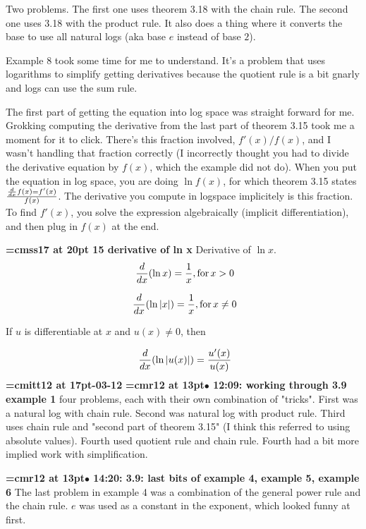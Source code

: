 Two problems. The first one uses theorem 3.18 with the chain rule. The second one uses 3.18 with the product rule. It also does a thing where it converts the base to use all natural logs (aka base $e$ instead of base $2$).
\par

Example 8 took some time for me to understand. It's a problem that uses logarithms to simplify getting derivatives because the quotient rule is a bit gnarly and logs can use the sum rule.
\par

The first part of getting the equation into log space was straight forward for me. Grokking computing the derivative  from the last part of theorem 3.15 took me a moment for it to click. There's this fraction involved, $f'(x)/f(x)$, and I wasn't handling that fraction correctly (I incorrectly thought you had to divide the derivative equation by $f(x)$, which the example did not do). When you put the equation in log space, you are doing $\ln f(x)$, for which theorem 3.15 states ${d \over dx} f(x) = f'(x) \over f(x)$. The derivative you compute in logspace implicitely is this fraction. To find $f'(x)$, you solve the expression algebraically (implicit differentiation), and then plug in $f(x)$ at the end.
\par

{\medskip\noindent\bf\font\titlefont=cmss17 at 20pt 15 derivative of ln x}\medskip
Derivative of $\ln x$.
$$\
{d \over dx} (\ln x) = {1 \over x}, \hbox{for} \, x > 0
$$

$$\
{d \over dx} (\ln |x|) = {1 \over x}, \hbox{for} \, x \ne 0
$$

If $u$ is differentiable at $x$ and $u(x) \ne 0$, then

$$\
{d \over dx} (\ln |u(x)|) = {
u'(x) \over u(x)
}
$$
{\medskip\noindent\bf\font\titlefont=cmitt12 at 17pt-03-12}\medskip
{\smallskip\noindent\bf\font\titlefont=cmr12 at 13pt\titlefont $\bullet$ 12:09: working through 3.9 example 1}\smallskip
four problems, each with their own combination of "tricks". First was a natural log with chain rule. Second was natural log with product rule. Third uses chain rule and "second part of theorem 3.15" (I think this referred to using absolute values). Fourth used quotient rule and chain rule. Fourth had a bit more implied work with simplification.
\par

{\smallskip\noindent\bf\font\titlefont=cmr12 at 13pt\titlefont $\bullet$ 14:20: 3.9: last bits of example 4, example 5, example 6}\smallskip
The last problem in example 4 was a combination of the general power rule and the chain rule. $e$ was used as a constant in the exponent, which looked funny at first.
\par


